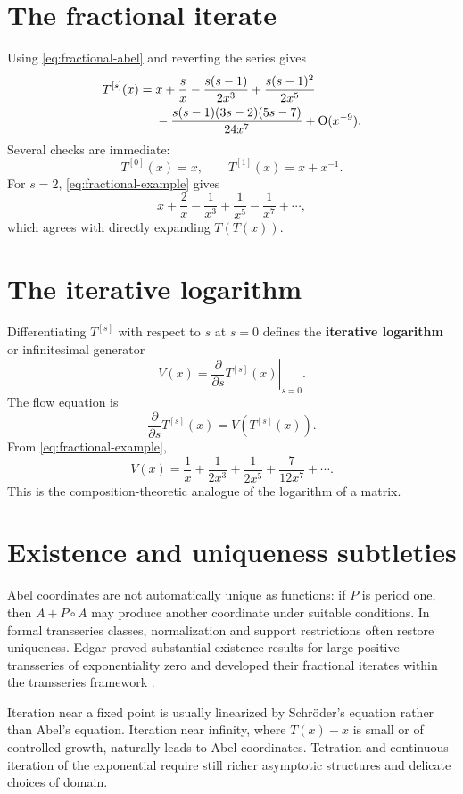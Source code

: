 \documentclass[11pt,openany]{book}
\theoremstyle{plain}
\theoremstyle{definition}
\theoremstyle{remark}
\newcommand{\bigO}{\mathrm{O}}
\newcommand{\defterm}[1]{\textbf{#1}}
\begin{document}
\section{The fractional iterate}
Using \cref{eq:fractional-abel} and reverting the series gives
\begin{align}
 T^{[s]}(x)={}&x+\frac{s}{x}
 -\frac{s(s-1)}{2x^3}
 +\frac{s(s-1)^2}{2x^5}\notag\\
 &-\frac{s(s-1)(3s-2)(5s-7)}{24x^7}
 +\bigO(x^{-9}).
 \label{eq:fractional-example}
\end{align}
Several checks are immediate:
\[
  T^{[0]}(x)=x,
  \qquad
  T^{[1]}(x)=x+x^{-1}.
\]
For $s=2$, \cref{eq:fractional-example} gives
\[
  x+\frac2x-\frac1{x^3}+\frac1{x^5}-\frac1{x^7}+\cdots,
\]
which agrees with directly expanding $T(T(x))$.

\section{The iterative logarithm}
Differentiating $T^{[s]}$ with respect to $s$ at $s=0$ defines the \defterm{iterative logarithm} or infinitesimal generator
\[
  V(x)=\left.\frac{\partial}{\partial s}T^{[s]}(x)\right|_{s=0}.
\]
The flow equation is
\[
  \frac{\partial}{\partial s}T^{[s]}(x)
  =V(T^{[s]}(x)).
\]
From \cref{eq:fractional-example},
\[
  V(x)=\frac1x+\frac1{2x^3}
  +\frac1{2x^5}+\frac7{12x^7}+\cdots.
\]
This is the composition-theoretic analogue of the logarithm of a matrix.

\section{Existence and uniqueness subtleties}
Abel coordinates are not automatically unique as functions: if $P$ is period one, then $A+P\circ A$ may produce another coordinate under suitable conditions. In formal transseries classes, normalization and support restrictions often restore uniqueness. Edgar proved substantial existence results for large positive transseries of exponentiality zero and developed their fractional iterates within the transseries framework \cite{EdgarFractional}.

\begin{advancedbox}
Iteration near a fixed point is usually linearized by Schr\"oder's equation rather than Abel's equation. Iteration near infinity, where $T(x)-x$ is small or of controlled growth, naturally leads to Abel coordinates. Tetration and continuous iteration of the exponential require still richer asymptotic structures and delicate choices of domain.
\end{advancedbox}
\end{document}
